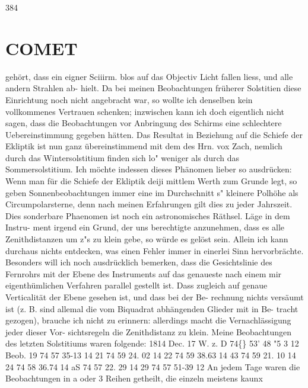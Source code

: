\documentclass[12pt,a4paper]{article}
\newcommand{\degree}{\textdegree}
\begin{document}
\newpage
384 

\section*{COMET}
gehört,  dass  ein  eigner  Sciiirm.  blos  auf  das  Objectiv  Licht  fallen  liess,  und  alle  andern  Strahlen  ab- 
hielt. Da  bei  meinen  Beobachtungen  früherer  Solstitien  diese  Einrichtung  noch  nicht  angebracht  war, 
so  wollte  ich  denselben  kein  vollkommenes  Vertrauen  schenken;  inzwischen  kann  ich  doch  eigentlich 
nicht  sagen,  dass  die  Beobachtungen  vor  Anbringung  des  Schirms  eine  schlechtere  Uebereinstimmung 
gegeben  hätten.  Das  Resultat  in  Beziehung  auf  die  Schiefe  der  Ekliptik  ist  nun  ganz  übereinstimmend 
mit  dem  des  Hrn.  vox  Zach,  nemlich  durch  das  Wintersolstitium  finden  sich  lo"  weniger  als  durch  das 
Sommersolstitium.  Ich  möchte  indessen  dieses  Phänomen  lieber  so  ausdrücken:  Wenn  man  für  die 
Schiefe  der  Ekliptik  deiji  mittlem  Werth  zum  Grunde  legt,  so  geben  Sonnenbeobachtungen  immer  eine 
im  Durchschnitt  s"  kleinere  Polhöhe  als  Circumpolarsterne,  denn  nach  meinen  Erfahrungen  gilt  dies  zu 
jeder  Jahrszeit.  Dies  sonderbare  Phaenomen  ist  noch  ein  astronomisches  Räthsel.  Läge  in  dem  Instru- 
ment irgend  ein  Grund,  der  uns  berechtigte  anzunehmen,  dass  es  alle  Zenithdistanzen  um  z"s  zu  klein 
gebe,  so  würde  es  gelöst  sein.  Allein  ich  kann  durchaus  nichts  entdecken,  was  einen  Fehler  immer  in 
einerlei  Sinn  hervorbrächte.  Besonders  will  ich  noch  ausdrücklich  bemerken,  dass  die  Gesichtslinie  des 
Fernrohrs  mit  der  Ebene  des  Instruments  auf  das  genaueste  nach  einem  mir  eigenthümlichen  Verfahren 
parallel  gestellt  ist.  Dass  zugleich  auf  genaue  Verticalität  der  Ebene  gesehen  ist,  und  dass  bei  der  Be- 
rechnung nichts  versäumt  ist  (z.  B.  sind  allemal  die  vom  Biquadrat  abhängenden  Glieder  mit  in  Be- 
tracht gezogen),  brauche  ich  nicht  zu  erinnern:  allerdings  macht  die  Vernachlässigung  jeder  dieser  Vor- 
sichtsregeln die  Zenithdistanz  zu  klein.     Meine  Beobachtungen  des  letzten  Solstitiums  waren  folgende: 
1814  Dec.  17 
W. z. D 
74\degree\{\} 
53' 
48  "5  3 
12  Beob. 
19 
74 
57 
35-13 
14 
21 
74 
59 
24.  02 
14 
22 
74 
59 
38.63 
14 
43 
74 
59 
21. 10 
14 
24 
74 
58 
36.74 
14 
aS 
74 
57 
22.  29 
14 
29 
74 
57 
51-39 
12 
An  jedem  Tage  waren  die  Beobachtungen  in  a  oder  3  Reihen  getheilt,  die  einzeln  meistens  kaunx 
\end{document}
